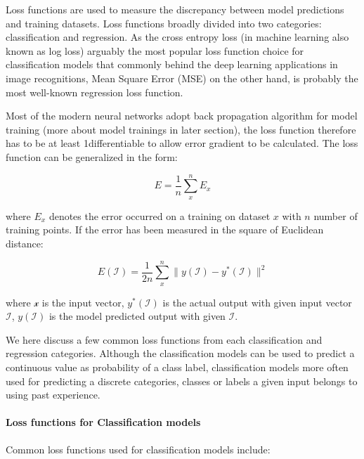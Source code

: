 Loss functions are used to measure the discrepancy between model predictions and training datasets. Loss functions broadly divided into two categories: classification and regression. As the cross entropy loss (in machine learning also known as log loss) arguably the most popular loss function choice for classification models that commonly behind the deep learning applications in image recognitions, Mean Square Error (MSE) on the other hand, is probably the most well-known regression loss function. 
\par 
Most of the modern neural networks adopt back propagation algorithm for model training (more about model trainings in later section), the loss function therefore has to be at least 1\textdegree differentiable to allow error gradient to be calculated. The loss function can be generalized in the form:

\begin{equation}
    E = \frac {1}{n} \sum_x^n E_x
\end{equation}

where $E_x$ denotes the error occurred on a training on dataset $x$ with $n$ number of training points. If the error has been measured in the square of Euclidean distance:

\begin{equation}
    E(\mathcal{I}) = \frac {1}{2n} \sum_x^n \parallel y(\mathcal{I}) - y^*(\mathcal{I}) \parallel^2 
\end{equation}

where $\mathcal{x}$ is the input vector, $y^*(\mathcal{I})$ is the actual output with given input vector $\mathcal{I}$, $y(\mathcal{I})$ is the model predicted output with given $\mathcal{I}$. 
\par 
We here discuss a few common loss functions from each classification and regression categories. Although the classification models can be used to predict a continuous value as probability of a class label, classification models more often used for predicting a discrete categories, classes or labels a given input belongs to using past experience. 

\paragraph {Loss functions for Classification models}
Common loss functions used for classification models include:

